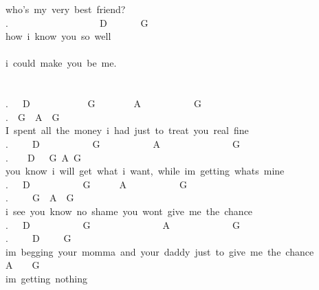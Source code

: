 {who's\ my\ very\ best\ friend?\\
.\ \ \ \ \ \ \ \ \ \ \ \ \ \ \ \ \ \ \ D\ \ \ \ \ \ \ G\\
how\ i\ know\ you\ so\ well\\
\\
i\ could\ make\ you\ be\ me.\\
\\
\\
.\ \ \ D\ \ \ \ \ \ \ \ \ \ \ \ G\ \ \ \ \ \ \ \ A\ \ \ \ \ \ \ \ \ \ \ G\ \ \ \ \ \ \ \ \ \ \ \ \ \\
.\ \ G\ \ A\ \ G\\
I\ spent\ all\ the\ money\ i\ had\ just\ to\ treat\ you\ real\ fine\\
.\ \ \ \ \ D\ \ \ \ \ \ \ \ \ \ \ G\ \ \ \ \ \ \ \ \ \ \ A\ \ \ \ \ \ \ \ \ \ \ \ \ \ \ G\ \ \ \ \ \ \ \\
.\ \ \ \ D\ \ \ G\ A\ G\\
you\ know\ i\ will\ get\ what\ i\ want,\ while\ im\ getting\ whats\ mine\\
.\ \ \ D\ \ \ \ \ \ \ \ \ \ \ G\ \ \ \ \ \ A\ \ \ \ \ \ \ \ \ \ \ G\ \ \ \ \ \ \ \ \ \ \ \\
.\ \ \ \ \ G\ \ A\ \ G\\
i\ see\ you\ know\ no\ shame\ you\ wont\ give\ me\ the\ chance\\
.\ \ \ D\ \ \ \ \ \ \ \ \ \ \ G\ \ \ \ \ \ \ \ \ \ \ \ \ \ \ A\ \ \ \ \ \ \ \ \ \ \ \ \ G\ \ \ \ \ \ \ \\
.\ \ \ \ \ D\ \ \ \ \ G\\
im\ begging\ your\ momma\ and\ your\ daddy\ just\ to\ give\ me\ the\ chance\\
A\ \ \ \ G\\
im\ getting\ nothing\\
}
